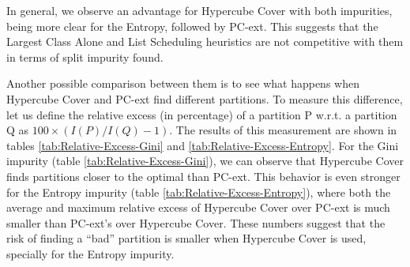 
In general, we observe an advantage for Hypercube Cover with both impurities, being more clear for the Entropy, followed by PC-ext. This suggests that the Largest Class Alone and List Scheduling heuristics are not competitive with them in terms of split impurity found.

Another possible comparison between them is to see what happens when Hypercube Cover and PC-ext find different partitions. To measure this difference, let us define the relative excess (in percentage) of a partition P w.r.t. a partition Q as $100 \times (I(P)/I(Q) - 1)$. The results of this measurement are shown in tables \ref{tab:Relative-Excess-Gini} and \ref{tab:Relative-Excess-Entropy}. For the Gini impurity (table \ref{tab:Relative-Excess-Gini}), we can observe that Hypercube Cover finds partitions closer to the optimal than PC-ext. This behavior is even stronger for the Entropy impurity (table \ref{tab:Relative-Excess-Entropy}), where both the average and maximum relative excess of Hypercube Cover over PC-ext is much smaller than PC-ext's over Hypercube Cover. These numbers suggest that the risk of finding a ``bad'' partition is smaller when Hypercube Cover is used, specially for the Entropy impurity.

